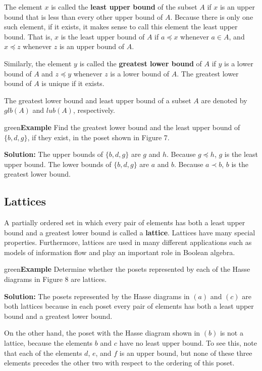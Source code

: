\documentclass[11pt]{article}
\newenvironment{example}[1][\unskip]{\begin{mybox}{green}{\textbf{Example} {#1}}}{\end{mybox}}
\begin{document}
The element $x$ is called the \textbf{least upper bound} of the subset $A$ if $x$ is an upper bound that is less than every other upper bound of $A$. Because there is only one such element, if it exists, it makes sense to call this element the least upper bound. That is, $x$ is the least upper bound of $A$ if $a \preceq x$ whenever $a \in A$, and $x \preceq z$ whenever $z$ is an upper bound of $A$.

Similarly, the element $y$ is called the \textbf{greatest lower bound} of $A$ if $y$ is a lower bound of $A$ and $z \preceq y$ whenever $z$ is a lower bound of $A$. The greatest lower bound of $A$ is unique if it exists. 

The greatest lower bound and least upper bound of a subset $A$ are denoted by
$glb(A)$ and $lub(A)$, respectively.

\begin{example}
Find the greatest lower bound and the least upper bound of $\{b, d, g\}$, if they exist, in the poset shown in Figure 7.

\textbf{Solution:}
The upper bounds of $\{b, d, g\}$ are $g$ and $h$. Because $g \preceq h$, $g$ is the least upper bound. The lower bounds of $\{b, d, g\}$ are $a$ and $b$. Because $a \prec b$, $b$ is the greatest lower bound.
\end{example}

\newpage
\subsection{Lattices}

A partially ordered set in which every pair of elements has both a least upper bound and a greatest lower bound is called a \textbf{lattice}. Lattices have many special properties. Furthermore, lattices are used in many different applications such as models of information flow and play an important role in Boolean algebra.

\begin{example}
Determine whether the posets represented by each of the Hasse diagrams in Figure 8 are lattices.

\textbf{Solution:}
The posets represented by the Hasse diagrams in $(a)$ and $(c)$ are both lattices because in each poset every pair of elements has both a least upper bound and a greatest lower bound. 

On the other hand, the poset with the Hasse diagram shown in $(b)$ is not a lattice, because the elements $b$ and $c$ have no least upper bound. To see this, note that each of the elements $d$, $e$, and $f$ is an upper bound, but none of these three elements precedes the other two with respect to the ordering of this poset.
\end{example}
\end{document}
